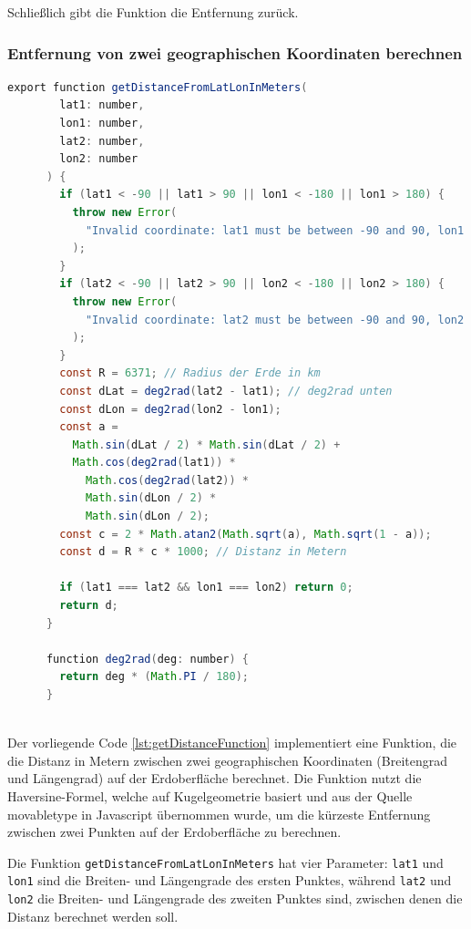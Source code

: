 Schließlich gibt die Funktion die Entfernung zurück.

\subsubsection{Entfernung von zwei geographischen Koordinaten berechnen}

\begin{lstlisting}[language=Java,caption=getDistanceFromLatLonInMeters Funktion,label=lst:getDistanceFunction]
    export function getDistanceFromLatLonInMeters(
        lat1: number,
        lon1: number,
        lat2: number,
        lon2: number
      ) {
        if (lat1 < -90 || lat1 > 90 || lon1 < -180 || lon1 > 180) {
          throw new Error(
            "Invalid coordinate: lat1 must be between -90 and 90, lon1 must be between -180 and 180"
          );
        }
        if (lat2 < -90 || lat2 > 90 || lon2 < -180 || lon2 > 180) {
          throw new Error(
            "Invalid coordinate: lat2 must be between -90 and 90, lon2 must be between -180 and 180"
          );
        }
        const R = 6371; // Radius der Erde in km
        const dLat = deg2rad(lat2 - lat1); // deg2rad unten
        const dLon = deg2rad(lon2 - lon1);
        const a =
          Math.sin(dLat / 2) * Math.sin(dLat / 2) +
          Math.cos(deg2rad(lat1)) *
            Math.cos(deg2rad(lat2)) *
            Math.sin(dLon / 2) *
            Math.sin(dLon / 2);
        const c = 2 * Math.atan2(Math.sqrt(a), Math.sqrt(1 - a));
        const d = R * c * 1000; // Distanz in Metern
      
        if (lat1 === lat2 && lon1 === lon2) return 0;
        return d;
      }
      
      function deg2rad(deg: number) {
        return deg * (Math.PI / 180);
      }
      
\end{lstlisting}
Der vorliegende Code \ref{lst:getDistanceFunction}
implementiert eine Funktion, die die
Distanz in Metern zwischen zwei geographischen Koordinaten
(Breitengrad und Längengrad) auf der Erdoberfläche
berechnet. Die Funktion nutzt die Haversine-Formel, welche auf Kugelgeometrie basiert und aus der Quelle \cite{movabletype} movabletype in Javascript übernommen wurde, um die kürzeste Entfernung zwischen zwei Punkten auf der Erdoberfläche zu berechnen.

Die Funktion \texttt{getDistanceFromLatLonInMeters} hat vier Parameter: \texttt{lat1} und \texttt{lon1} sind die Breiten- und Längengrade des ersten Punktes, während \texttt{lat2} und \texttt{lon2} die Breiten- und Längengrade des zweiten Punktes sind, zwischen denen die Distanz berechnet werden soll.

